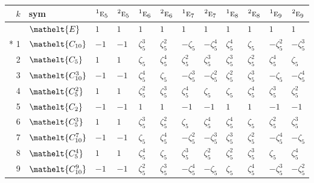 \documentclass[10pt,a4paper]{article}
\numberwithin{equation}{section}
\newcommand{\eltfont}[1]{{\let\sigma\eltsigma\mathelt{#1}}}
\newcommand{\irr}[1]{\text{\normalfont\scshape #1}}
\newcommand{\conjpair}[1]{{}^{#1}}
\newcommand{\cls}[1]{\eltfont{#1}}
\newcommand{\rootunity}[1]{\zeta_{#1}}
\begin{document}
{\small\setlength{\tabcolsep}{4pt}
\begin{longtable}{@{}rlllllllllll@{}}\toprule
$k$ & sym & $\conjpair{1}\irr{e}_{5}$ & $\conjpair{2}\irr{e}_{5}$ & $\conjpair{1}\irr{e}_{6}$ & $\conjpair{2}\irr{e}_{6}$ & $\conjpair{1}\irr{e}_{7}$ & $\conjpair{2}\irr{e}_{7}$ & $\conjpair{1}\irr{e}_{8}$ & $\conjpair{2}\irr{e}_{8}$ & $\conjpair{1}\irr{e}_{9}$ & $\conjpair{2}\irr{e}_{9}$\\\midrule\endhead
\bottomrule\endfoot\endlastfoot
0 & $\cls{E}$ & $1$ & $1$ & $1$ & $1$ & $1$ & $1$ & $1$ & $1$ & $1$ & $1$\\*
1 & $\cls{C_{10}}$ & $-1$ & $-1$ & $\rootunity{5}^{3}$ & $\rootunity{5}^{2}$ & $-\rootunity{5}$ & $-\rootunity{5}^{4}$ & $\rootunity{5}^{4}$ & $\rootunity{5}$ & $-\rootunity{5}^{2}$ & $-\rootunity{5}^{3}$\\
2 & $\cls{C_{5}}$ & $1$ & $1$ & $\rootunity{5}$ & $\rootunity{5}^{4}$ & $\rootunity{5}^{2}$ & $\rootunity{5}^{3}$ & $\rootunity{5}^{3}$ & $\rootunity{5}^{2}$ & $\rootunity{5}^{4}$ & $\rootunity{5}$\\
3 & $\cls{C_{10}^{3}}$ & $-1$ & $-1$ & $\rootunity{5}^{4}$ & $\rootunity{5}$ & $-\rootunity{5}^{3}$ & $-\rootunity{5}^{2}$ & $\rootunity{5}^{2}$ & $\rootunity{5}^{3}$ & $-\rootunity{5}$ & $-\rootunity{5}^{4}$\\
4 & $\cls{C_{5}^{2}}$ & $1$ & $1$ & $\rootunity{5}^{2}$ & $\rootunity{5}^{3}$ & $\rootunity{5}^{4}$ & $\rootunity{5}$ & $\rootunity{5}$ & $\rootunity{5}^{4}$ & $\rootunity{5}^{3}$ & $\rootunity{5}^{2}$\\
5 & $\cls{C_{2}}$ & $-1$ & $-1$ & $1$ & $1$ & $-1$ & $-1$ & $1$ & $1$ & $-1$ & $-1$\\
6 & $\cls{C_{5}^{3}}$ & $1$ & $1$ & $\rootunity{5}^{3}$ & $\rootunity{5}^{2}$ & $\rootunity{5}$ & $\rootunity{5}^{4}$ & $\rootunity{5}^{4}$ & $\rootunity{5}$ & $\rootunity{5}^{2}$ & $\rootunity{5}^{3}$\\
7 & $\cls{C_{10}^{7}}$ & $-1$ & $-1$ & $\rootunity{5}$ & $\rootunity{5}^{4}$ & $-\rootunity{5}^{2}$ & $-\rootunity{5}^{3}$ & $\rootunity{5}^{3}$ & $\rootunity{5}^{2}$ & $-\rootunity{5}^{4}$ & $-\rootunity{5}$\\
8 & $\cls{C_{5}^{4}}$ & $1$ & $1$ & $\rootunity{5}^{4}$ & $\rootunity{5}$ & $\rootunity{5}^{3}$ & $\rootunity{5}^{2}$ & $\rootunity{5}^{2}$ & $\rootunity{5}^{3}$ & $\rootunity{5}$ & $\rootunity{5}^{4}$\\
9 & $\cls{C_{10}^{9}}$ & $-1$ & $-1$ & $\rootunity{5}^{2}$ & $\rootunity{5}^{3}$ & $-\rootunity{5}^{4}$ & $-\rootunity{5}$ & $\rootunity{5}$ & $\rootunity{5}^{4}$ & $-\rootunity{5}^{3}$ & $-\rootunity{5}^{2}$\\

\end{longtable}}
\end{document}
